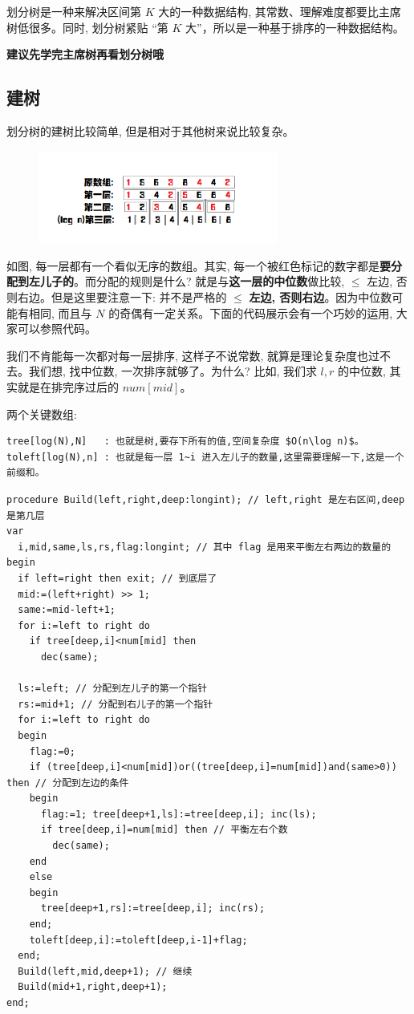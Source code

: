 
划分树是一种来解决区间第 $K$ 大的一种数据结构, 其常数、理解难度都要比主席树低很多。同时, 划分树紧贴 “第 $K$ 大”，所以是一种基于排序的一种数据结构。

\textbf{建议先学完主席树再看划分树哦}

\subsection{建树}

划分树的建树比较简单, 但是相对于其他树来说比较复杂。

\begin{figure}[htbp]
\centering
\includegraphics[width=0.7\textwidth]{docs/ds/images/dividing1.png} 

\end{figure}

如图, 每一层都有一个看似无序的数组。其实, 每一个被红色标记的数字都是\textbf{要分配到左儿子的}。而分配的规则是什么? 就是与\textbf{这一层的中位数}做比较, $\leq$ 左边, 否则右边。但是这里要注意一下: 并不是严格的 $\leq$ \textbf{左边, 否则右边}。因为中位数可能有相同, 而且与 $N$ 的奇偶有一定关系。下面的代码展示会有一个巧妙的运用, 大家可以参照代码。

我们不肯能每一次都对每一层排序, 这样子不说常数, 就算是理论复杂度也过不去。我们想, 找中位数, 一次排序就够了。为什么? 比如, 我们求 $l,r$ 的中位数, 其实就是在排完序过后的 $num[mid]$。

两个关键数组:

\begin{verbatim}
tree[log(N),N]   : 也就是树,要存下所有的值,空间复杂度 $O(n\log n)$。
toleft[log(N),n] : 也就是每一层 1~i 进入左儿子的数量,这里需要理解一下,这是一个前缀和。
\end{verbatim}

\begin{verbatim}
procedure Build(left,right,deep:longint); // left,right 是左右区间,deep是第几层
var
  i,mid,same,ls,rs,flag:longint; // 其中 flag 是用来平衡左右两边的数量的
begin
  if left=right then exit; // 到底层了
  mid:=(left+right) >> 1;
  same:=mid-left+1;
  for i:=left to right do 
    if tree[deep,i]<num[mid] then
      dec(same);

  ls:=left; // 分配到左儿子的第一个指针
  rs:=mid+1; // 分配到右儿子的第一个指针
  for i:=left to right do
  begin
    flag:=0;
    if (tree[deep,i]<num[mid])or((tree[deep,i]=num[mid])and(same>0)) then // 分配到左边的条件
    begin
      flag:=1; tree[deep+1,ls]:=tree[deep,i]; inc(ls);
      if tree[deep,i]=num[mid] then // 平衡左右个数
        dec(same);
    end
    else
    begin
      tree[deep+1,rs]:=tree[deep,i]; inc(rs);
    end;
    toleft[deep,i]:=toleft[deep,i-1]+flag;
  end;
  Build(left,mid,deep+1); // 继续
  Build(mid+1,right,deep+1);
end;
\end{verbatim}


